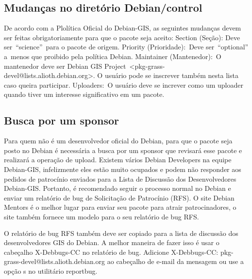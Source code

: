 \subsection{Mudanças no diretório Debian/control}

De acordo com a Plolítica Oficial do Debian-GIS, as seguintes mudanças devem ser feitas obrigatoriamente para que o pacote seja aceito:
Section (Seção): Deve ser “science” para o pacote de origem.
Priority (Prioridade): Deve ser “optional” a menos que proibido pela política Debian.
Maintainer (Mantenedor): O mantenedor deve ser Debian GIS Project <pkg-grass-devel@lists.alioth.debian.org>. O usuário pode se inscrever também nesta lista caso queira participar.
Uploaders: O usuário deve se increver como um uploader quando tiver um interesse significativo em um pacote.

\subsection{Busca por um sponsor}

Para quem não é um desenvolvedor oficial do Debian, para que o pacote seja posto no Debian é necessária a busca por um sponsor que revisará esse pacote e realizará a operação de upload. Existem vários Debian Developers na equipe Debian-GIS, infelizmente eles estão muito ocupados e podem não responder aos pedidos de patrocínio enviados para a Lista de Discussão dos Desenvolvedores Debian-GIS. Portanto, é recomendado seguir o processo normal no Debian e enviar um relatório de bug de Solicitação de Patrocínio (RFS). O site Debian Mentors é o melhor lugar para enviar seu pacote para atrair patrocinadores, o site também fornece um modelo para o seu relatório de bug RFS.

O relatório de bug RFS também deve ser copiado para a lista de discussão dos desenvolvedores GIS do Debian. A melhor maneira de fazer isso é usar o cabeçalho X-Debbugs-CC no relatório de bug. Adicione X-Debbugs-CC: pkg-grass-devel@lists.alioth.debian.org ao cabeçalho de e-mail da mensagem ou use a opção s no utilitário reportbug.
